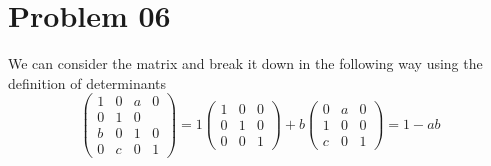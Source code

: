\documentclass[letter]{article}
\begin{document}
\section*{Problem 06} 
We can consider the matrix and break it down in the following way using the definition of determinants
\[
	\begin{pmatrix} 1 & 0 & a &0
	\\

0 & 1 &0&\\
b&0&1&0\\
0&c&0&1\end{pmatrix} =
		1 \begin{pmatrix} 1 & 0 & 0 \\
		0 & 1 & 0 \\ 
	0 & 0 & 1\end{pmatrix} + 
			b \begin{pmatrix} 0 & a &0
			\\
		1 & 0 & 0 \\ 
	c & 0 & 1\end{pmatrix}  = 1 - ab
\]
\end{document}
